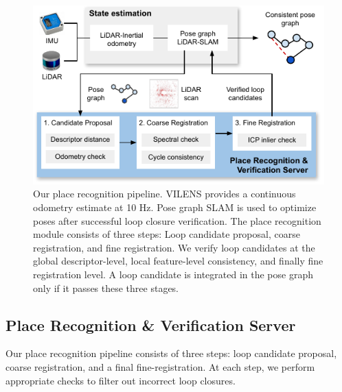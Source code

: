 

\begin{figure}[t]
  \centering
  \includegraphics[width=\columnwidth]{pics/method_pipeline.pdf}
  \caption{Our place recognition pipeline. VILENS provides a continuous odometry estimate at 10 Hz. Pose graph SLAM is used to optimize poses after successful loop closure verification. 
  The place recognition module consists of three steps: Loop candidate proposal, coarse registration, and fine registration. We verify loop candidates
  at the global descriptor-level, local feature-level consistency, and finally fine registration level. A loop candidate is integrated in the pose graph only if it passes these three stages.}
  \label{fig:pipeline}
\end{figure}


\subsection*{Place Recognition \& Verification Server} \label{sec:pipeline}
Our place recognition pipeline consists of three steps: loop candidate proposal, coarse registration, and a final fine-registration. At each step, we perform appropriate checks to filter out incorrect loop closures.

